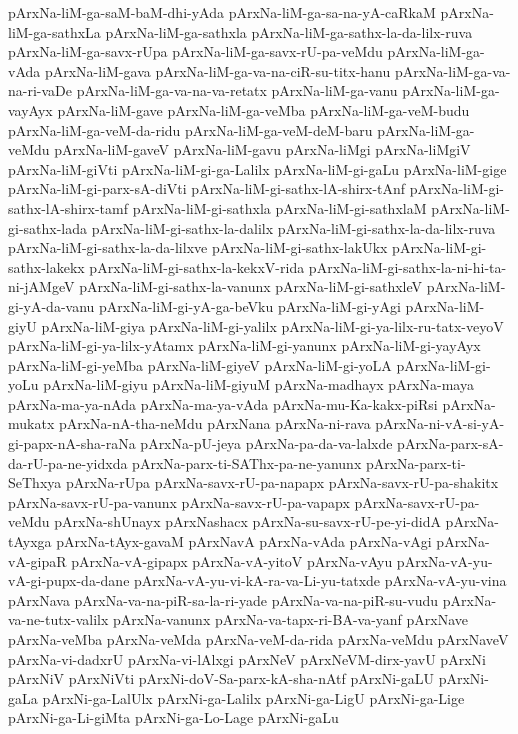 {pArxNa-liM-ga-saM-baM-dhi-yAda
pArxNa-liM-ga-sa-na-yA-caRkaM
pArxNa-liM-ga-sathxLa
pArxNa-liM-ga-sathxla
pArxNa-liM-ga-sathx-la-da-lilx-ruva
pArxNa-liM-ga-savx-rUpa
pArxNa-liM-ga-savx-rU-pa-veMdu
pArxNa-liM-ga-vAda
pArxNa-liM-gava
pArxNa-liM-ga-va-na-ciR-su-titx-hanu
pArxNa-liM-ga-va-na-ri-vaDe
pArxNa-liM-ga-va-na-va-retatx
pArxNa-liM-ga-vanu
pArxNa-liM-ga-vayAyx
pArxNa-liM-gave
pArxNa-liM-ga-veMba
pArxNa-liM-ga-veM-budu
pArxNa-liM-ga-veM-da-ridu
pArxNa-liM-ga-veM-deM-baru
pArxNa-liM-ga-veMdu
pArxNa-liM-gaveV
pArxNa-liM-gavu
pArxNa-liMgi
pArxNa-liMgiV
pArxNa-liM-giVti
pArxNa-liM-gi-ga-Lalilx
pArxNa-liM-gi-gaLu
pArxNa-liM-gige
pArxNa-liM-gi-parx-sA-diVti
pArxNa-liM-gi-sathx-lA-shirx-tAnf
pArxNa-liM-gi-sathx-lA-shirx-tamf
pArxNa-liM-gi-sathxla
pArxNa-liM-gi-sathxlaM
pArxNa-liM-gi-sathx-lada
pArxNa-liM-gi-sathx-la-dalilx
pArxNa-liM-gi-sathx-la-da-lilx-ruva
pArxNa-liM-gi-sathx-la-da-lilxve
pArxNa-liM-gi-sathx-lakUkx
pArxNa-liM-gi-sathx-lakekx
pArxNa-liM-gi-sathx-la-kekxV-rida
pArxNa-liM-gi-sathx-la-ni-hi-ta-ni-jAMgeV
pArxNa-liM-gi-sathx-la-vanunx
pArxNa-liM-gi-sathxleV
pArxNa-liM-gi-yA-da-vanu
pArxNa-liM-gi-yA-ga-beVku
pArxNa-liM-gi-yAgi
pArxNa-liM-giyU
pArxNa-liM-giya
pArxNa-liM-gi-yalilx
pArxNa-liM-gi-ya-lilx-ru-tatx-veyoV
pArxNa-liM-gi-ya-lilx-yAtamx
pArxNa-liM-gi-yanunx
pArxNa-liM-gi-yayAyx
pArxNa-liM-gi-yeMba
pArxNa-liM-giyeV
pArxNa-liM-gi-yoLA
pArxNa-liM-gi-yoLu
pArxNa-liM-giyu
pArxNa-liM-giyuM
pArxNa-madhayx
pArxNa-maya
pArxNa-ma-ya-nAda
pArxNa-ma-ya-vAda
pArxNa-mu-Ka-kakx-piRsi
pArxNa-mukatx
pArxNa-nA-tha-neMdu
pArxNana
pArxNa-ni-rava
pArxNa-ni-vA-si-yA-gi-papx-nA-sha-raNa
pArxNa-pU-jeya
pArxNa-pa-da-va-lalxde
pArxNa-parx-sA-da-rU-pa-ne-yidxda
pArxNa-parx-ti-SAThx-pa-ne-yanunx
pArxNa-parx-ti-SeThxya
pArxNa-rUpa
pArxNa-savx-rU-pa-napapx
pArxNa-savx-rU-pa-shakitx
pArxNa-savx-rU-pa-vanunx
pArxNa-savx-rU-pa-vapapx
pArxNa-savx-rU-pa-veMdu
pArxNa-shUnayx
pArxNashacx
pArxNa-su-savx-rU-pe-yi-didA
pArxNa-tAyxga
pArxNa-tAyx-gavaM
pArxNavA
pArxNa-vAda
pArxNa-vAgi
pArxNa-vA-gipaR
pArxNa-vA-gipapx
pArxNa-vA-yitoV
pArxNa-vAyu
pArxNa-vA-yu-vA-gi-pupx-da-dane
pArxNa-vA-yu-vi-kA-ra-va-Li-yu-tatxde
pArxNa-vA-yu-vina
pArxNava
pArxNa-va-na-piR-sa-la-ri-yade
pArxNa-va-na-piR-su-vudu
pArxNa-va-ne-tutx-valilx
pArxNa-vanunx
pArxNa-va-tapx-ri-BA-va-yanf
pArxNave
pArxNa-veMba
pArxNa-veMda
pArxNa-veM-da-rida
pArxNa-veMdu
pArxNaveV
pArxNa-vi-dadxrU
pArxNa-vi-lAlxgi
pArxNeV
pArxNeVM-dirx-yavU
pArxNi
pArxNiV
pArxNiVti
pArxNi-doV-Sa-parx-kA-sha-nAtf
pArxNi-gaLU
pArxNi-gaLa
pArxNi-ga-LalUlx
pArxNi-ga-Lalilx
pArxNi-ga-LigU
pArxNi-ga-Lige
pArxNi-ga-Li-giMta
pArxNi-ga-Lo-Lage
pArxNi-gaLu
}
